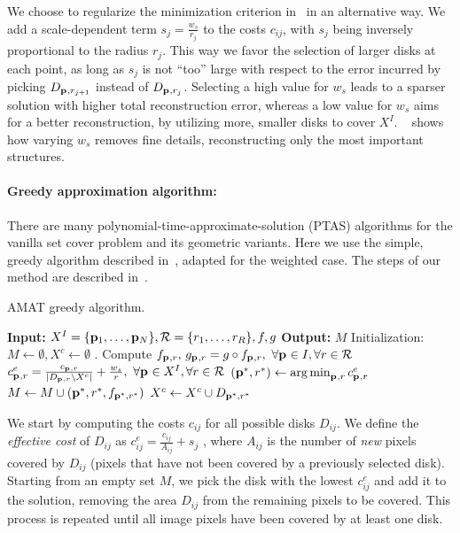 \documentclass[10pt,twocolumn,letterpaper]{article}
\begin{document}
We choose to regularize the minimization criterion in~ in an alternative way. 
We add a scale-dependent term $s_j = \frac{w_s}{r_j}$ to the costs $c_{ij}$, with $s_j$ 
being inversely proportional to the radius $r_j$.
This way we favor the selection of larger disks at each point, as long as $s_j$ is not ``too'' large
with respect to the error incurred by picking $D_{\mathbf{p}_{},r_{j+1}}$ instead of $D_{\mathbf{p}_{},r_j}$.
Selecting a high value for $w_s$ leads to a sparser solution with higher total reconstruction error,
whereas a low value for $w_s$ aims for a better reconstruction, by utilizing more, smaller disks
to cover $X^I$.
~ shows how varying $w_s$ removes fine details, reconstructing only the most important structures.

\paragraph{Greedy approximation algorithm:}
There are many polynomial-time-approximate-solution (PTAS) algorithms for the vanilla set cover problem
and its geometric variants.
Here we use the simple, greedy algorithm described in~\cite{vazirani2013approximation}, adapted for the weighted case.
The steps of our method are described in~.
\begin{algorithm}[t]
\caption{AMAT greedy algorithm.}
\label{alg:greedy}
	\begin{algorithmic}[1]
	\Statex \textbf{Input:} $X^I=\{\mathbf{p}_{1},\ldots,\mathbf{p}_{N}\},\mathcal{R}=\{r_1,\ldots,r_R\},f,g$
	\Statex \textbf{Output:} $M$
	\State Initialization: $M \leftarrow \emptyset,X^c \leftarrow \emptyset$ .
	\State Compute $f_{\mathbf{p}_{},r},\, g_{\mathbf{p}_{},r} = g \circ f_{\mathbf{p}_{},r},\,\, \forall \mathbf{p}_{} \in I, \forall r \in \mathcal{R}$
		\State $c_{\mathbf{p}_{},r}^e = \frac{c_{\mathbf{p}_{},r}}{|D_{\mathbf{p}_{},r} \setminus X^c|}+\frac{w_s}{r},\,\, \forall \mathbf{p}_{} \in X^I, \forall r \in \mathcal{R}$
		\State $(\mathbf{p}_{}^{*},r^{*}) \leftarrow \operatorname*{arg\,min}_{\mathbf{p}_{},r}{c_{\mathbf{p}_{},r}^e}$		
		\State $M\leftarrow M\cup{(\mathbf{p}_{}^{*},r^{*},f_{\mathbf{p}_{}^{*},r^{*}})}$
		\State $X^c \leftarrow X^c \cup D_{\mathbf{p}_{}^{*},r^{*}}$ 
	\EndWhile
	\end{algorithmic}
\end{algorithm}
We start by computing the costs $c_{ij}$ for all possible disks $D_{ij}$.
We define the \emph{effective cost} of $D_{ij}$ as $c_{ij}^e = \frac{c_{ij}}{A_{ij}} + s_j$ , where $A_{ij}$ is the number
of \emph{new} pixels covered by $D_{ij}$ (pixels that have not been covered by a previously selected disk).
Starting from an empty set $M$, we pick the disk with the lowest $c_{ij}^e$ and add it to the solution, 
removing the area $D_{ij}$ from the remaining pixels to be covered.
This process is repeated until all image pixels have been covered by at least one disk.
\end{document}
